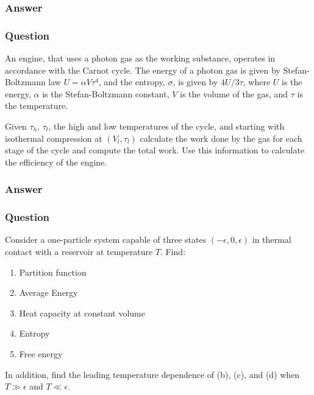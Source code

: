 \subsubsection{Answer}



\subsubsection{Question}
An engine, that uses a photon gas as the working substance, operates in accordance with the Carnot cycle. The energy of a photon gas is given by Stefan-Boltzmann law $U=\alpha V\tau^4$, and the entropy, $\sigma$, is given by $4U/3\tau$, where $U$ is the energy, $\alpha$ is the Stefan-Boltzmann constant, $V$ is the volume of the gas, and $\tau$ is the temperature.

Given $\tau_h$, $\tau_l$, the high and low temperatures of the cycle, and starting with isothermal compression at $(V_l, \tau_l)$ calculate the work done by the gas for each stage of the cycle and compute the total work. Use this information to calculate the efficiency of the engine.
\subsubsection{Answer}



\subsubsection{Question}
Consider a one-particle system capable of three states $(-\epsilon,0,\epsilon)$ in thermal contact with a reservoir at temperature $T$. Find:
\begin{enumerate}
	\item Partition function
	\item Average Energy
	\item Heat capacity at constant volume
	\item Entropy
	\item Free energy
\end{enumerate}
In addition, find the leading temperature dependence of (b), (c), and (d) when $T\gg \epsilon$ and $T\ll \epsilon$.
